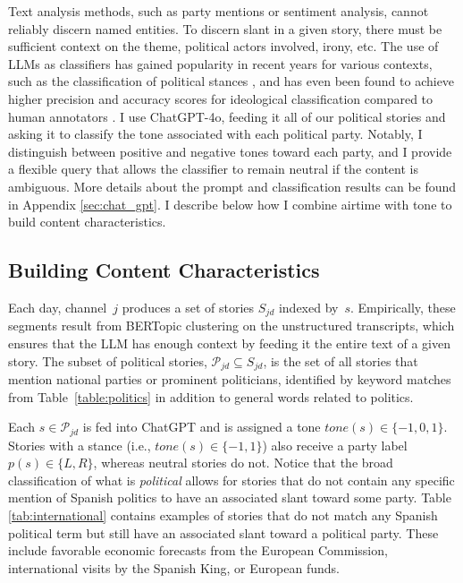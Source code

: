 \documentclass[12pt]{article}
\begin{document}
	Text analysis methods, such as party mentions or sentiment analysis, cannot reliably discern named entities. To discern slant in a given story, there must be sufficient context on the theme, political actors involved, irony, etc. The use of LLMs as classifiers has gained popularity in recent years for various contexts, such as the classification of political stances \citep{lemens}, and has even been found to achieve higher precision and accuracy scores for ideological classification compared to human annotators \citep{tornberg2023}. I use ChatGPT-4o, feeding it all of our political stories and asking it to classify the tone associated with each political party. Notably, I distinguish between positive and negative tones toward each party, and I provide a flexible query that allows the classifier to remain neutral if the content is ambiguous. More details about the prompt and classification results can be found in Appendix \ref{sec:chat_gpt}. I describe below how I combine airtime with tone to build content characteristics.
	
	\subsection*{Building Content Characteristics}
	
	Each day, channel~$j$ produces a set of stories $S_{jd}$ indexed by~$s$. Empirically, these segments result from BERTopic clustering on the unstructured transcripts, which ensures that the LLM has enough context by feeding it the entire text of a given story. The subset of political stories, $\mathcal{P}_{jd} \subseteq S_{jd}$, is the set of all stories that mention national parties or prominent politicians, identified by keyword matches from Table~\ref{table:politics} in addition to general words related to politics.
	
	Each $s \in \mathcal{P}_{jd}$ is fed into ChatGPT and is assigned a tone $tone(s) \in \{-1,0,1\}$. Stories with a stance (i.e., $tone(s) \in \{-1,1\}$) also receive a party label $p(s) \in \{L,R\}$, whereas neutral stories do not. Notice that the broad classification of what is \textit{political} allows for stories that do not contain any specific mention of Spanish politics to have an associated slant toward some party. Table \ref{tab:international} contains examples of stories that do not match any Spanish political term but still have an associated slant toward a political party. These include favorable economic forecasts from the European Commission, international visits by the Spanish King, or European funds.
	
\end{document}
